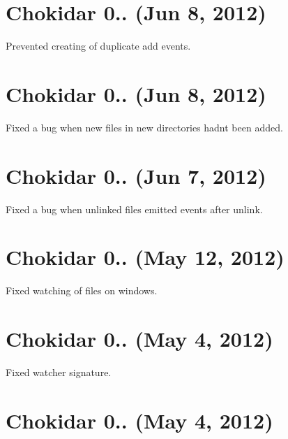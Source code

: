 \section*{Chokidar 0.. (Jun 8, 2012)}


\begin{DoxyItemize}
\item Prevented creating of duplicate \textquotesingle{}add\textquotesingle{} events.
\end{DoxyItemize}

\section*{Chokidar 0.. (Jun 8, 2012)}


\begin{DoxyItemize}
\item Fixed a bug when new files in new directories hadn\textquotesingle{}t been added.
\end{DoxyItemize}

\section*{Chokidar 0.. (Jun 7, 2012)}


\begin{DoxyItemize}
\item Fixed a bug when unlinked files emitted events after unlink.
\end{DoxyItemize}

\section*{Chokidar 0.. (May 12, 2012)}


\begin{DoxyItemize}
\item Fixed watching of files on windows.
\end{DoxyItemize}

\section*{Chokidar 0.. (May 4, 2012)}


\begin{DoxyItemize}
\item Fixed watcher signature.
\end{DoxyItemize}

\section*{Chokidar 0.. (May 4, 2012)}


